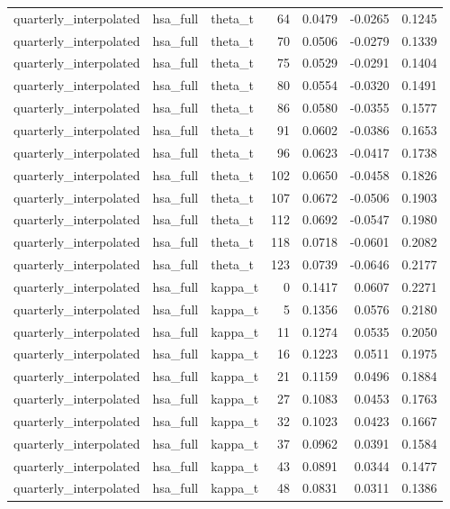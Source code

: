 \begin{tabular}{lllrrrr}
quarterly\_interpolated & hsa\_full & theta\_t & 64 & 0.0479 & -0.0265 & 0.1245 \\
quarterly\_interpolated & hsa\_full & theta\_t & 70 & 0.0506 & -0.0279 & 0.1339 \\
quarterly\_interpolated & hsa\_full & theta\_t & 75 & 0.0529 & -0.0291 & 0.1404 \\
quarterly\_interpolated & hsa\_full & theta\_t & 80 & 0.0554 & -0.0320 & 0.1491 \\
quarterly\_interpolated & hsa\_full & theta\_t & 86 & 0.0580 & -0.0355 & 0.1577 \\
quarterly\_interpolated & hsa\_full & theta\_t & 91 & 0.0602 & -0.0386 & 0.1653 \\
quarterly\_interpolated & hsa\_full & theta\_t & 96 & 0.0623 & -0.0417 & 0.1738 \\
quarterly\_interpolated & hsa\_full & theta\_t & 102 & 0.0650 & -0.0458 & 0.1826 \\
quarterly\_interpolated & hsa\_full & theta\_t & 107 & 0.0672 & -0.0506 & 0.1903 \\
quarterly\_interpolated & hsa\_full & theta\_t & 112 & 0.0692 & -0.0547 & 0.1980 \\
quarterly\_interpolated & hsa\_full & theta\_t & 118 & 0.0718 & -0.0601 & 0.2082 \\
quarterly\_interpolated & hsa\_full & theta\_t & 123 & 0.0739 & -0.0646 & 0.2177 \\
quarterly\_interpolated & hsa\_full & kappa\_t & 0 & 0.1417 & 0.0607 & 0.2271 \\
quarterly\_interpolated & hsa\_full & kappa\_t & 5 & 0.1356 & 0.0576 & 0.2180 \\
quarterly\_interpolated & hsa\_full & kappa\_t & 11 & 0.1274 & 0.0535 & 0.2050 \\
quarterly\_interpolated & hsa\_full & kappa\_t & 16 & 0.1223 & 0.0511 & 0.1975 \\
quarterly\_interpolated & hsa\_full & kappa\_t & 21 & 0.1159 & 0.0496 & 0.1884 \\
quarterly\_interpolated & hsa\_full & kappa\_t & 27 & 0.1083 & 0.0453 & 0.1763 \\
quarterly\_interpolated & hsa\_full & kappa\_t & 32 & 0.1023 & 0.0423 & 0.1667 \\
quarterly\_interpolated & hsa\_full & kappa\_t & 37 & 0.0962 & 0.0391 & 0.1584 \\
quarterly\_interpolated & hsa\_full & kappa\_t & 43 & 0.0891 & 0.0344 & 0.1477 \\
quarterly\_interpolated & hsa\_full & kappa\_t & 48 & 0.0831 & 0.0311 & 0.1386 \\

\end{tabular}
